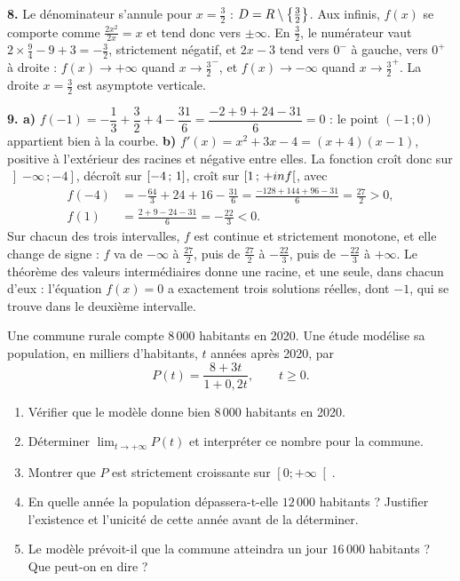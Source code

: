 \begin{corrige}[annales]
\textbf{8.} Le dénominateur s'annule pour $x = \frac32$ :
$D = R\setminus\left\{\frac32\right\}$. Aux infinis, $f(x)$ se comporte
comme $\frac{2x^{2}}{2x} = x$ et tend donc vers $\pm\infty$. En $\frac32$, le
numérateur vaut $2\times\frac94-9+3 = -\frac32$, strictement négatif, et
$2x-3$ tend vers $0^{-}$ à gauche, vers $0^{+}$ à droite :
$f(x)\to+\infty$ quand $x\to\frac32^{-}$, et $f(x)\to-\infty$ quand
$x\to\frac32^{+}$. La droite $x = \frac32$ est asymptote verticale.

\textbf{9. a)} $f(-1) = -\dfrac13+\dfrac32+4-\dfrac{31}{6}
= \dfrac{-2+9+24-31}{6} = 0$ : le point $(-1\,;0)$ appartient bien à la
courbe.
\textbf{b)} $f'(x) = x^{2}+3x-4 = (x+4)(x-1)$, positive à l'extérieur des
racines et négative entre elles. La fonction croît donc sur
$\left]-\infty\,;-4\right]$, décroît sur $\left[-4\,;\,1\right]$, croît sur
$\left[1\,;\,+inf\right[$, avec
\[\begin{aligned}
f(-4) &= -\frac{64}{3}+24+16-\frac{31}{6} = \frac{-128+144+96-31}{6}
  = \frac{27}{2} > 0,
  \\[3pt]
  f(1) &= \frac{2+9-24-31}{6} = -\frac{22}{3} < 0 .
\end{aligned}\]
Sur chacun des trois intervalles, $f$ est continue et strictement monotone, et
elle change de signe : $f$ va de $-\infty$ à $\frac{27}{2}$, puis de
$\frac{27}{2}$ à $-\frac{22}{3}$, puis de $-\frac{22}{3}$ à $+\infty$. Le
théorème des valeurs intermédiaires donne une racine, et une seule, dans
chacun d'eux : l'équation $f(x) = 0$ a exactement trois solutions réelles,
dont $-1$, qui se trouve dans le deuxième intervalle.
\end{corrige}

\begin{jecherche}
Une commune rurale compte $8\,000$ habitants en 2020. Une étude modélise sa
population, en milliers d'habitants, $t$ années après 2020, par
\[
  P(t) = \frac{8 + 3t}{1 + 0{,}2t}, \qquad t \geq 0 .
\]

\begin{enumerate}[label=\textbf{\arabic*.}, leftmargin=*, itemsep=0.3em]
  \item Vérifier que le modèle donne bien $8\,000$ habitants en 2020.
  \item Déterminer $\lim_{t \to +\infty} P(t)$ et interpréter ce nombre pour
        la commune.
  \item Montrer que $P$ est strictement croissante sur $\left[0 ; +\infty\right[$.
  \item En quelle année la population dépassera-t-elle $12\,000$ habitants ?
        Justifier l'existence et l'unicité de cette année avant de la
        déterminer.
  \item Le modèle prévoit-il que la commune atteindra un jour $16\,000$
        habitants ? Que peut-on en dire ?
\end{enumerate}
\end{jecherche}

